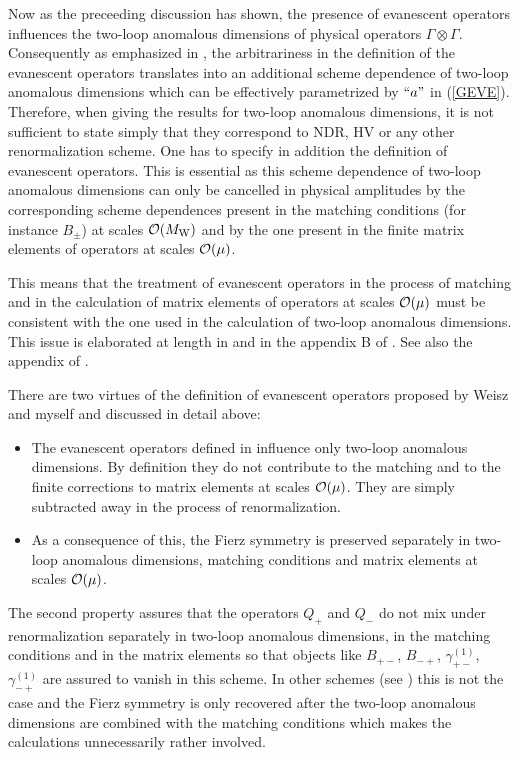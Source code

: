 \documentclass[12pt]{article}
\newcommand{\mw}{M_{\rm W}}
\newcommand{\bi}{\begin{itemize}}
\newcommand{\ei}{\end{itemize}}
\newcommand{\ord}{{\cal O}}
\begin{document}
\begin{itemize}
\begin{itemize}
Now as the preceeding discussion has shown, the presence of evanescent
operators influences the two-loop anomalous dimensions of physical
operators $\Gamma\otimes\Gamma$. Consequently as emphasized in
\cite{HNE}, the arbitrariness in the definition of the evanescent 
operators translates into an additional scheme dependence of two-loop
anomalous dimensions which can be effectively parametrized by  
$``a"$ in (\ref{GEVE}). Therefore, when giving the results for two-loop
anomalous dimensions, it is not sufficient to state simply that
they correspond to NDR, HV or any other renormalization scheme.
One has to specify in addition the definition of evanescent operators.
This is essential as this scheme dependence of two-loop anomalous
dimensions can only be cancelled in physical amplitudes by the 
corresponding scheme dependences present in the matching conditions
(for instance $B_\pm$) at scales $\ord(\mw)$ and by the one present
in the finite matrix elements of operators at scales $\ord(\mu)$.

This means that the treatment of evanescent operators in the
process of matching and in the calculation of
matrix elements of operators at scales $\ord(\mu)$ must be
consistent with the one used in the calculation of two-loop
anomalous dimensions. This issue is elaborated at length in
\cite{HNE,SH94,UN95} and in the appendix B of \cite{BLMM}.
See also the appendix of \cite{Potte}.

There are two virtues of the definition of evanescent operators
proposed by Weisz and myself and discussed in detail above:

\bi
\item
The evanescent operators defined in \cite{WEISZ} influence only
two-loop anomalous dimensions. By definition they do not contribute
to the matching and to the finite corrections to matrix elements
at scales $\ord(\mu)$. They are simply subtracted away in the process
of renormalization.
\item
As a consequence of this, the Fierz symmetry is preserved separately
in two-loop anomalous dimensions, matching conditions and
matrix elements at scales $\ord(\mu)$.
\ei
The second property assures that the operators $Q_+$ and $Q_-$
do not mix under renormalization separately in two-loop anomalous
dimensions, in the matching conditions and in the matrix elements
so that objects like $B_{+-}$, $B_{-+}$, $\gamma^{(1)}_{+-}$,
$\gamma^{(1)}_{-+}$ are assured to vanish in this scheme.
In other schemes (see \cite{DuGr}) this is not the case and
the Fierz symmetry is only recovered after the two-loop anomalous
dimensions are combined with the matching conditions which 
makes the calculations unnecessarily rather involved.


\end{itemize}
\end{itemize}
\end{document}
